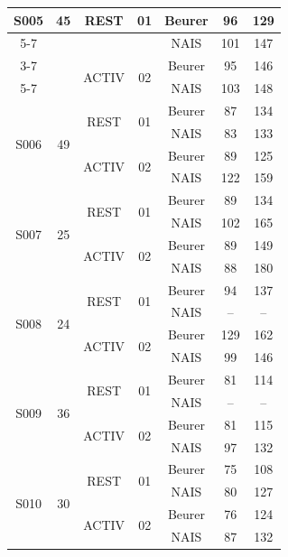 \documentclass[a4paper, 11pt]{scrartcl}
\begin{document}
\begin{table}[H]
{\begin{tabular}{|c|c|c|c|c|c|c|}
\multirow{4}{*}{S005} & \multirow{4}{*}{45} & \multirow{2}{*}{REST} & \multirow{2}{*}{01} & Beurer & 96 & 129 \\ \cline{5-7}
& & & & NAIS & 101 & 147 \\ \cline{3-7}
& & \multirow{2}{*}{ACTIV} & \multirow{2}{*}{02} & Beurer & 95 & 146 \\ \cline{5-7}
& & & & NAIS & 103 & 148 \\ \hline

\multirow{4}{*}{S006} & \multirow{4}{*}{49} & \multirow{2}{*}{REST} & \multirow{2}{*}{01} & Beurer & 87 & 134 \\ \cline{5-7}
& & & & NAIS & 83 & 133 \\ \cline{3-7}
& & \multirow{2}{*}{ACTIV} & \multirow{2}{*}{02} & Beurer & 89 & 125 \\ \cline{5-7}
& & & & NAIS & 122 & 159 \\ \hline

\multirow{4}{*}{S007} & \multirow{4}{*}{25} & \multirow{2}{*}{REST} & \multirow{2}{*}{01} & Beurer & 89 & 134 \\ \cline{5-7}
& & & & NAIS & 102 & 165 \\ \cline{3-7}
& & \multirow{2}{*}{ACTIV} & \multirow{2}{*}{02} & Beurer & 89 & 149 \\ \cline{5-7}
& & & & NAIS & 88 & 180 \\ \hline

\multirow{4}{*}{S008} & \multirow{4}{*}{24} & \multirow{2}{*}{REST} & \multirow{2}{*}{01} & Beurer & 94 & 137 \\ \cline{5-7}
& & & & NAIS & -- & -- \\ \cline{3-7}
& & \multirow{2}{*}{ACTIV} & \multirow{2}{*}{02} & Beurer & 129 & 162 \\ \cline{5-7}
& & & & NAIS & 99 & 146 \\ \hline

\multirow{4}{*}{S009} & \multirow{4}{*}{36} & \multirow{2}{*}{REST} & \multirow{2}{*}{01} & Beurer & 81 & 114 \\ \cline{5-7}
& & & & NAIS & -- & -- \\ \cline{3-7}
& & \multirow{2}{*}{ACTIV} & \multirow{2}{*}{02} & Beurer & 81 & 115 \\ \cline{5-7}
& & & & NAIS & 97 & 132 \\ \hline

\multirow{4}{*}{S010} & \multirow{4}{*}{30} & \multirow{2}{*}{REST} & \multirow{2}{*}{01} & Beurer & 75 & 108 \\ \cline{5-7}
& & & & NAIS & 80 & 127 \\ \cline{3-7}
& & \multirow{2}{*}{ACTIV} & \multirow{2}{*}{02} & Beurer & 76 & 124 \\ \cline{5-7}
& & & & NAIS & 87 & 132 \\ \hline


\end{tabular}}
\end{table}
\end{document}
